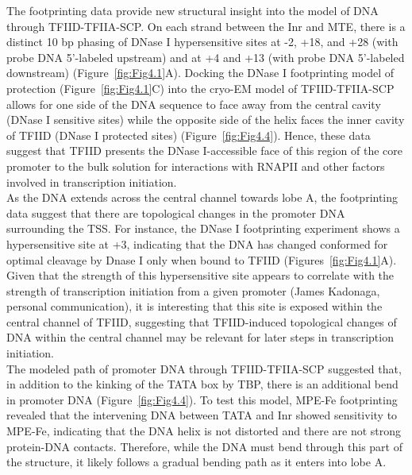 \indent The footprinting data provide new structural insight into the model of DNA through TFIID-TFIIA-SCP. On each strand between the Inr and MTE, there is a distinct 10 bp phasing of DNase I hypersensitive sites at -2, +18, and +28 (with probe DNA 5’-labeled upstream) and at +4 and +13 (with probe DNA 5’-labeled downstream) (Figure~\ref{fig:Fig4.1}A).  Docking the DNase I footprinting model of protection (Figure~\ref{fig:Fig4.1}C) into the cryo-EM model of TFIID-TFIIA-SCP allows for one side of the DNA sequence to face away from the central cavity (DNase I sensitive sites) while the opposite side of the helix faces the inner cavity of TFIID (DNase I protected sites) (Figure~\ref{fig:Fig4.4}). Hence, these data suggest that TFIID presents the DNase I-accessible face of this region of the core promoter to the bulk solution for interactions with RNAPII and other factors involved in transcription initiation. \\
\indent As the DNA extends across the central channel towards lobe A, the footprinting data suggest that there are topological changes in the promoter DNA surrounding the TSS. For instance, the DNase I footprinting experiment shows a hypersensitive site at +3, indicating that the DNA has changed conformed for optimal cleavage by Dnase I only when bound to TFIID (Figures~\ref{fig:Fig4.1}A). Given that the strength of this hypersensitive site appears to correlate with the strength of transcription initiation from a given promoter (James Kadonaga, personal communication), it is interesting that this site is exposed within the central channel of TFIID, suggesting that TFIID-induced topological changes of DNA within the central channel may be relevant for later steps in transcription initiation. \\
\indent The modeled path of promoter DNA through TFIID-TFIIA-SCP suggested that, in addition to the kinking of the TATA box by TBP, there is an additional bend in promoter DNA (Figure~\ref{fig:Fig4.4}). To test this model, MPE-Fe footprinting revealed that the intervening DNA between TATA and Inr showed sensitivity to MPE-Fe, indicating that the DNA helix is not distorted and there are not strong protein-DNA contacts. Therefore, while the DNA must bend through this part of the structure, it likely follows a gradual bending path as it enters into lobe A.\\

